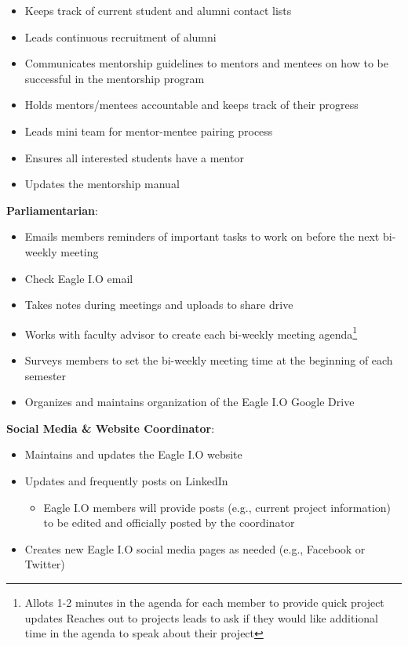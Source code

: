 \documentclass[
]{book}
\providecommand{\tightlist}{%
  \setlength{\itemsep}{0pt}\setlength{\parskip}{0pt}}
\begin{document}
\begin{itemize}
\tightlist
\item
  Keeps track of current student and alumni contact lists\\
\item
  Leads continuous recruitment of alumni\\
\item
  Communicates mentorship guidelines to mentors and mentees on how to be successful in the mentorship program\\
\item
  Holds mentors/mentees accountable and keeps track of their progress\\
\item
  Leads mini team for mentor-mentee pairing process\\
\item
  Ensures all interested students have a mentor
\item
  Updates the mentorship manual
\end{itemize}

\textbf{Parliamentarian}:

\begin{itemize}
\tightlist
\item
  Emails members reminders of important tasks to work on before the next bi-weekly meeting
\item
  Check Eagle I.O email
\item
  Takes notes during meetings and uploads to share drive\\
\item
  Works with faculty advisor to create each bi-weekly meeting agenda\footnote{Allots 1-2 minutes in the agenda for each member to provide quick project updates Reaches out to projects leads to ask if they would like additional time in the agenda to speak about their project}
\item
  Surveys members to set the bi-weekly meeting time at the beginning of each semester
\item
  Organizes and maintains organization of the Eagle I.O Google Drive
\end{itemize}

\textbf{Social Media \& Website Coordinator}:

\begin{itemize}
\tightlist
\item
  Maintains and updates the Eagle I.O website
\item
  Updates and frequently posts on LinkedIn

  \begin{itemize}
  \tightlist
  \item
    Eagle I.O members will provide posts (e.g., current project information) to be edited and officially posted by the coordinator
  \end{itemize}
\item
  Creates new Eagle I.O social media pages as needed (e.g., Facebook or Twitter)
\end{itemize}
\end{document}
